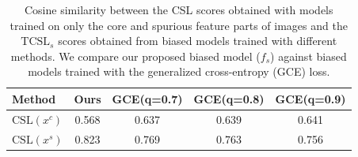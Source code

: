 \documentclass[letter,11pt]{article}
\begin{document}
\begin{table}[!hbtp]
\centering
{}
\caption{We conduct an ablation study on the $\text{TCSL}_c$ score. Since $\alpha > 0.9$ for all datasets except MetaShift, we set $r\!=\!0.1$ as in the main paper. For MetaShift, as $\alpha = 0.882$, we set $r\!=\!0.2$. We use CB ERM for retraining on all of the identified coresets. The best WGA for each dataset is shown in \textbf{bold} and the second best value is \underline{underlined}.}
\label{tab:tab_tcslc}
\end{table}


\begin{table}[!hbtp]
\centering
\small %
\setlength{\tabcolsep}{4pt} %
\begin{tabular}{lcccc}
\toprule
\textbf{Method} & \textbf{Ours} & \textbf{GCE(q=0.7)} & \textbf{GCE(q=0.8)} & \textbf{GCE(q=0.9)} \\
\midrule
$\text{CSL}(x^c)$ & 0.568 & 0.637 & 0.639 & 0.641 \\
$\text{CSL}(x^s)$ & 0.823 & 0.769 & 0.763 & 0.756 \\
\bottomrule
\end{tabular}
\caption{Cosine similarity between the CSL scores obtained with models trained on only the core and spurious feature parts of images and the $\text{TCSL}_s$ scores obtained from biased models trained with different methods. We compare our proposed biased model ($f_s$) against biased models trained with the generalized cross-entropy (GCE) loss.}
\label{tab:tab_tcsls}
\end{table}
\end{document}
